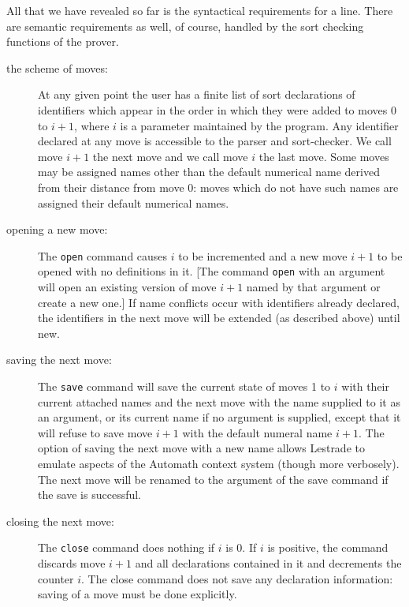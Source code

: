\documentclass[12pt]{article}
\begin{document}
All that we have revealed so far is the syntactical requirements for a line.   There are semantic requirements as well, of course, handled by the sort checking functions of the prover.

\begin{description}

\item[the scheme of moves:]  At any given point the user has a finite list of sort declarations of identifiers which appear in the order in which they were added to moves 0 to $i+1$, where $i$ is a parameter maintained by the program.   Any identifier declared at any move is accessible to the parser and sort-checker.  We call move $i+1$ the next move and we call move $i$ the last move.  Some moves may be assigned names other than the default numerical name derived from their distance from move 0:  moves which do not have such names are assigned their default numerical names.

\item[opening a new move:]  The {\tt open} command causes $i$ to be incremented and a new move $i+1$ to be opened with no definitions in it.  [The command
{\tt open} with an argument will open an existing version of move $i+1$ named by that argument or create a new one.]   If name conflicts occur with identifiers already declared,
the identifiers in the next move will be extended (as described above) until new.

\item[saving the next move:]  The {\tt save} command will save the current state of moves 1 to $i$ with their current attached names and the next move
with the name supplied to it as an argument, or its current name if no argument is supplied, except that it will refuse to save move $i+1$ with the default numeral name $i+1$.
  The option of saving the next move with a new name allows Lestrade to emulate aspects of
the Automath context system (though more verbosely).  The next move will be renamed to the argument of the save command if the save is successful.

\item[closing the next move:]  The {\tt close} command does nothing if $i$ is 0.  If $i$ is positive, the command discards move $i+1$ and all declarations contained in it and decrements the counter $i$.  The close command does not save any declaration information:  saving of a move must be done explicitly.


\end{description}
\end{document}
